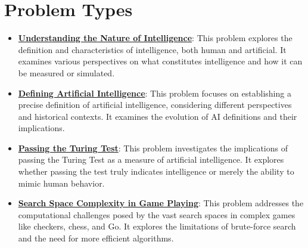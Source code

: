 \documentclass{article}%
\begin{document}
\section{Problem Types}%
\label{sec:ProblemTypes}%
\begin{itemize}[leftmargin=*]%
\item \href{https://purdue.brightspace.com/d2l/common/assets/pdfjs-d2l-dist/1.0.14-legacy/web/viewer.html?file=\%2Fcontent\%2Fenforced\%2F1095467-wl.202510.CS.24300.001\%2F02L2-Intro.pdf\%3Fou\%3D1095467\&lang=en-us\&container=d2l-fileviewer-rendered-pdf\&fullscreen=d2l-fileviewer-rendered-pdf-dialog\&height=667#page=5}{\textbf{Understanding the Nature of Intelligence}}: This problem explores the definition and characteristics of intelligence, both human and artificial. It examines various perspectives on what constitutes intelligence and how it can be measured or simulated.%
\item \href{https://purdue.brightspace.com/d2l/common/assets/pdfjs-d2l-dist/1.0.14-legacy/web/viewer.html?file=\%2Fcontent\%2Fenforced\%2F1095467-wl.202510.CS.24300.001\%2F02L2-Intro.pdf\%3Fou\%3D1095467\&lang=en-us\&container=d2l-fileviewer-rendered-pdf\&fullscreen=d2l-fileviewer-rendered-pdf-dialog\&height=667#page=5}{\textbf{Defining Artificial Intelligence}}: This problem focuses on establishing a precise definition of artificial intelligence, considering different perspectives and historical contexts. It examines the evolution of AI definitions and their implications.%
\item \href{https://purdue.brightspace.com/d2l/common/assets/pdfjs-d2l-dist/1.0.14-legacy/web/viewer.html?file=\%2Fcontent\%2Fenforced\%2F1095467-wl.202510.CS.24300.001\%2F02L2-Intro.pdf\%3Fou\%3D1095467\&lang=en-us\&container=d2l-fileviewer-rendered-pdf\&fullscreen=d2l-fileviewer-rendered-pdf-dialog\&height=667#page=6}{\textbf{Passing the Turing Test}}: This problem investigates the implications of passing the Turing Test as a measure of artificial intelligence. It explores whether passing the test truly indicates intelligence or merely the ability to mimic human behavior.%
\item \href{https://purdue.brightspace.com/d2l/common/assets/pdfjs-d2l-dist/1.0.14-legacy/web/viewer.html?file=\%2Fcontent\%2Fenforced\%2F1095467-wl.202510.CS.24300.001\%2F02L2-Intro.pdf\%3Fou\%3D1095467\&lang=en-us\&container=d2l-fileviewer-rendered-pdf\&fullscreen=d2l-fileviewer-rendered-pdf-dialog\&height=667#page=11}{\textbf{Search Space Complexity in Game Playing}}: This problem addresses the computational challenges posed by the vast search spaces in complex games like checkers, chess, and Go. It explores the limitations of brute-force search and the need for more efficient algorithms.%

\end{itemize}
\end{document}

